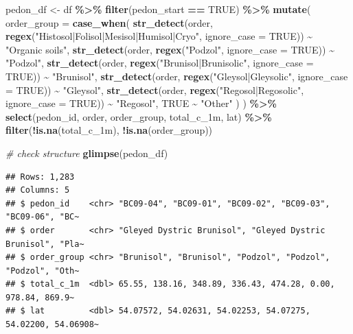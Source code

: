 \documentclass[
]{article}
\newenvironment{Shaded}{\begin{snugshade}}{\end{snugshade}}
\newcommand{\AttributeTok}[1]{\textcolor[rgb]{0.13,0.29,0.53}{#1}}
\newcommand{\CommentTok}[1]{\textcolor[rgb]{0.56,0.35,0.01}{\textit{#1}}}
\newcommand{\ConstantTok}[1]{\textcolor[rgb]{0.56,0.35,0.01}{#1}}
\newcommand{\FunctionTok}[1]{\textcolor[rgb]{0.13,0.29,0.53}{\textbf{#1}}}
\newcommand{\NormalTok}[1]{#1}
\newcommand{\OtherTok}[1]{\textcolor[rgb]{0.56,0.35,0.01}{#1}}
\newcommand{\SpecialCharTok}[1]{\textcolor[rgb]{0.81,0.36,0.00}{\textbf{#1}}}
\newcommand{\StringTok}[1]{\textcolor[rgb]{0.31,0.60,0.02}{#1}}
\begin{document}
\begin{Shaded}
\begin{Highlighting}[]
\NormalTok{pedon\_df }\OtherTok{\textless{}{-}}\NormalTok{ df }\SpecialCharTok{\%\textgreater{}\%}
  \FunctionTok{filter}\NormalTok{(pedon\_start }\SpecialCharTok{==} \ConstantTok{TRUE}\NormalTok{) }\SpecialCharTok{\%\textgreater{}\%}
  \FunctionTok{mutate}\NormalTok{(}
    \AttributeTok{order\_group =} \FunctionTok{case\_when}\NormalTok{(}
      \FunctionTok{str\_detect}\NormalTok{(order, }\FunctionTok{regex}\NormalTok{(}\StringTok{"Histosol|Folisol|Mesisol|Humisol|Cryo"}\NormalTok{, }\AttributeTok{ignore\_case =} \ConstantTok{TRUE}\NormalTok{)) }\SpecialCharTok{\textasciitilde{}} \StringTok{"Organic soils"}\NormalTok{,}
      \FunctionTok{str\_detect}\NormalTok{(order, }\FunctionTok{regex}\NormalTok{(}\StringTok{"Podzol"}\NormalTok{, }\AttributeTok{ignore\_case =} \ConstantTok{TRUE}\NormalTok{)) }\SpecialCharTok{\textasciitilde{}} \StringTok{"Podzol"}\NormalTok{,}
      \FunctionTok{str\_detect}\NormalTok{(order, }\FunctionTok{regex}\NormalTok{(}\StringTok{"Brunisol|Brunisolic"}\NormalTok{, }\AttributeTok{ignore\_case =} \ConstantTok{TRUE}\NormalTok{)) }\SpecialCharTok{\textasciitilde{}} \StringTok{"Brunisol"}\NormalTok{,}
      \FunctionTok{str\_detect}\NormalTok{(order, }\FunctionTok{regex}\NormalTok{(}\StringTok{"Gleysol|Gleysolic"}\NormalTok{, }\AttributeTok{ignore\_case =} \ConstantTok{TRUE}\NormalTok{)) }\SpecialCharTok{\textasciitilde{}} \StringTok{"Gleysol"}\NormalTok{,}
      \FunctionTok{str\_detect}\NormalTok{(order, }\FunctionTok{regex}\NormalTok{(}\StringTok{"Regosol|Regosolic"}\NormalTok{, }\AttributeTok{ignore\_case =} \ConstantTok{TRUE}\NormalTok{)) }\SpecialCharTok{\textasciitilde{}} \StringTok{"Regosol"}\NormalTok{,}
      \ConstantTok{TRUE} \SpecialCharTok{\textasciitilde{}} \StringTok{"Other"}
\NormalTok{    )}
\NormalTok{  ) }\SpecialCharTok{\%\textgreater{}\%}
  \FunctionTok{select}\NormalTok{(pedon\_id, order, order\_group, total\_c\_1m, lat) }\SpecialCharTok{\%\textgreater{}\%}
  \FunctionTok{filter}\NormalTok{(}\SpecialCharTok{!}\FunctionTok{is.na}\NormalTok{(total\_c\_1m), }\SpecialCharTok{!}\FunctionTok{is.na}\NormalTok{(order\_group))}

\CommentTok{\# check structure}
\FunctionTok{glimpse}\NormalTok{(pedon\_df)}
\end{Highlighting}
\end{Shaded}

\begin{verbatim}
## Rows: 1,283
## Columns: 5
## $ pedon_id    <chr> "BC09-04", "BC09-01", "BC09-02", "BC09-03", "BC09-06", "BC~
## $ order       <chr> "Gleyed Dystric Brunisol", "Gleyed Dystric Brunisol", "Pla~
## $ order_group <chr> "Brunisol", "Brunisol", "Podzol", "Podzol", "Podzol", "Oth~
## $ total_c_1m  <dbl> 65.55, 138.16, 348.89, 336.43, 474.28, 0.00, 978.84, 869.9~
## $ lat         <dbl> 54.07572, 54.02631, 54.02253, 54.07275, 54.02200, 54.06908~
\end{verbatim}
\end{document}
